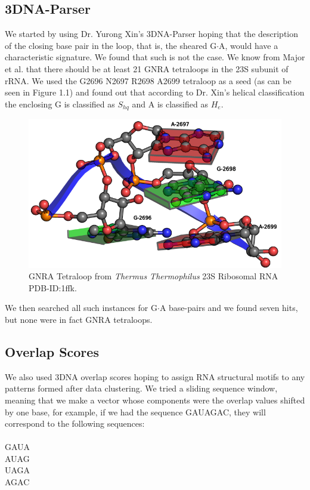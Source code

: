 \subsection{3DNA-Parser}
We started by using Dr. Yurong Xin's 3DNA-Parser hoping that the
description of the closing base pair in the loop, that is, the
sheared G$\cdot$A, would have a characteristic signature.
We found that such is not the case. We know from Major et
al. \cite{lemieux2006} that there should be at least 21 GNRA tetraloops
in the 23S subunit of rRNA. We used the G2696 N2697 R2698 A2699
tetraloop as a seed (as can be seen in Figure 1.1) and found out
that according to Dr. Xin's helical classification the enclosing G is
classified as $S_{hq}$ and A is classified as $H_{e}$. 
\begin{figure}[htbp]
\centering 
\includegraphics[angle=0, scale=0.5]{Chapter1/gnra.png}
\caption{GNRA Tetraloop from \textit{Thermus Thermophilus} 23S Ribosomal RNA PDB-ID:1ffk.}
\end{figure}
We then searched all such instances for G$\cdot$A base-pairs and we found seven hits,
but none were in fact GNRA tetraloops.

\subsection{Overlap Scores} 
We also used 3DNA overlap scores hoping to assign RNA structural motifs to
any patterns formed after data clustering.
We tried a sliding sequence window, meaning that we make a
vector whose components were the overlap values shifted by one
base, for example, if we had the sequence GAUAGAC, they will
correspond to the following sequences:\\
\\
GAUA\\
AUAG\\
UAGA\\
AGAC\\

